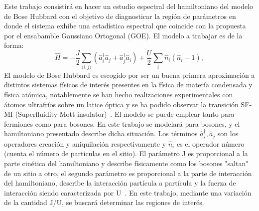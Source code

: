 \documentclass[spanish,titlepage,table]{practicas}
\begin{document}
Este trabajo consistirá en hacer un estudio espectral del hamiltoniano del modelo de Bose Hubbard 
con el objetivo de diagnosticar la región de parámetros en donde el sistema exhibe una estadística espectral 
que coincide con la propuesta por el ensabamble Gaussiano Ortogonal (GOE). El modelo a trabajar es de la forma:
\begin{equation}
\hat{H}
= -\frac{J}{2} \sum_{\langle i,j\rangle} \!\left(\hat{a}_i^{\dagger}\hat{a}_j + \hat{a}_j^{\dagger}\hat{a}_i\right)
+ \frac{U}{2}\sum_{i}\hat{n}_i(\hat{n}_i - 1),
\end{equation}
El modelo de Bose Hubbard es escogido por ser un buena primera aproximación a distintos sistemas físicos de interés presentes en la física de matería condensada y física atómica, notablemente 
se han hecho realizaciones experimentales con átomos ultrafríos sobre un latice óptica y se ha podido observar la transición SF-MI (Superfluidity-Mott insulator)~\cite{Zhang2010}. 
El modelo se puede emplear tanto para fermiones como para bosones. En este trabajo se modelará para bosones, y el hamiltoniano presentado describe dicha situación.
Los términos $\hat{a}_i^{\dagger},\hat{a}_j$ son los operadores creación y aniquilación respectivamente y $\hat{n}_i$ es el operador número (cuenta el número de particulas en el sitio).
El parámetro J es proporcional a la parte cinética del hamiltoniano y describe físicamente como los bosones "saltan" de un sitio a otro, el segundo parámetro es proporcional a la parte de interacción del hamiltoniano, describe 
la interacción partícula a partícula y la fuerza de interacción siendo caracterizada por U~\cite{Zhang2010}. 
En este trabajo, mediante una variación de la cantidad J/U, se buscará determinar las regiones de interés.
\end{document}
